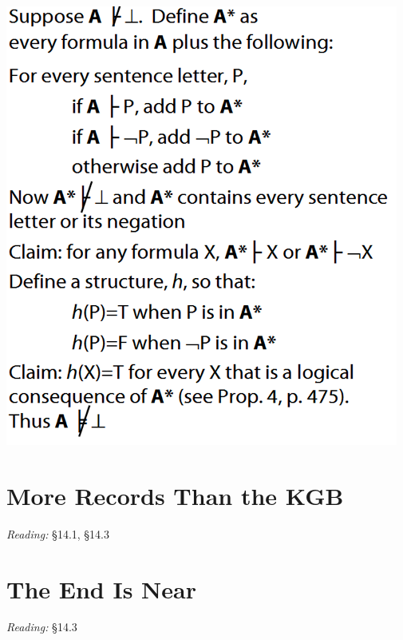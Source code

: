 \documentclass[12pt]{extarticle}
\begin{document}
\begin{multicols*}{3}
\begin{center}
\includegraphics[scale=0.35]{img/unit_455_completeness.png}
\end{center}
 
 
\section{More Records Than the KGB}
 
\emph{Reading:} §14.1, §14.3
 
 
 
\section{The End Is Near}
 
\emph{Reading:} §14.3
 
 

\end{multicols*}
\end{document}
